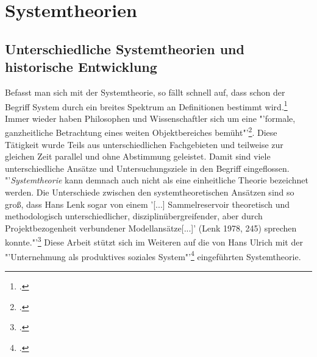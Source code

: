 \documentclass[a4paper,12pt]{article}
\begin{document}
\section{Systemtheorien}
\subsection{Unterschiedliche Systemtheorien und historische Entwicklung}
Befasst man sich mit der Systemtheorie, so fällt schnell auf, dass schon der Begriff System durch ein breites Spektrum an Definitionen bestimmt wird.\footcite[S. 18]{Patzak1982} Immer wieder haben Philosophen und Wissenschaftler sich um eine "'formale, ganzheitliche Betrachtung eines weiten Objektbereiches bemüht"'\footcite[S. 102]{Ulrich1968}. Diese Tätigkeit wurde Teils aus unterschiedlichen Fachgebieten und teilweise zur gleichen Zeit parallel und ohne Abstimmung geleistet. Damit sind viele unterschiedliche Ansätze und Untersuchungsziele in den Begriff eingeflossen. "'\textit{Systemtheorie} kann demnach auch nicht als eine einheitliche Theorie bezeichnet werden. Die Unterschiede zwischen den systemtheoretischen Ansätzen sind so groß, dass Hans Lenk sogar von einem '[...] Sammelreservoir theoretisch und methodologisch unterschiedlicher, disziplinübergreifender, aber durch Projektbezogenheit verbundener Modellansätze[...]' (Lenk 1978, 245) sprechen konnte."'\footcite[S. 111]{Diesner2015}
Diese Arbeit stützt sich im Weiteren auf die von Hans Ulrich mit der "'Unternehmung als produktives soziales System"'\footcite[S. 3]{Ulrich1968} eingeführten Systemtheorie.
\end{document}
